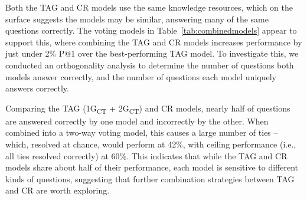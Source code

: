 {} Both the TAG and CR models use the same knowledge resources, which on the surface suggests the models may be similar, answering many of the same questions correctly.  The voting models in Table~\ref{tab:combinedmodels} appear to support this, where combining the TAG and CR models increases performance by just under 2\% P@1 over the best-performing TAG model.  To investigate this, we conducted an orthogonality analysis to determine the number of questions both models answer correctly, and the number of questions each model uniquely answers correctly.

Comparing the TAG (1G\textsubscript{CT} + 2G\textsubscript{CT}) and CR models, nearly half of questions are answered correctly by one model and incorrectly by the other.  When combined into a two-way voting model, this causes a large number of ties -- which, resolved at chance, would perform at 42\%, with ceiling performance (i.e., all ties resolved correctly) at 60\%.  This indicates that while the TAG and CR models share about half of their performance, each model is sensitive to different kinds of questions, suggesting that further combination strategies between TAG and CR are worth exploring.


